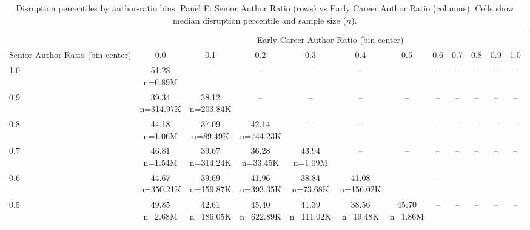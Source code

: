 \begin{table}\centering
            \caption{Disruption percentiles by author-ratio bins. Panel E: Senior Author Ratio (rows) vs Early Career Author Ratio (columns). Cells show median disruption percentile and sample size ($n$).}
            \scriptsize
            \setlength\tabcolsep{4pt}
            \renewcommand{\arraystretch}{1.1}
            \begin{tabular}{lccccccccccc}
            \toprule
            & \multicolumn{11}{c}{Early Career Author Ratio (bin center)} \\
            \cmidrule(lr){2-12}
            Senior Author Ratio (bin center) & 0.0 & 0.1 & 0.2 & 0.3 & 0.4 & 0.5 & 0.6 & 0.7 & 0.8 & 0.9 & 1.0 \\
            \midrule
            1.0 & \makecell{51.28 \\ \scriptsize n=6.89M} & -- & -- & -- & -- & -- & -- & -- & -- & -- & -- \\
0.9 & \makecell{39.34 \\ \scriptsize n=314.97K} & \makecell{38.12 \\ \scriptsize n=203.84K} & -- & -- & -- & -- & -- & -- & -- & -- & -- \\
0.8 & \makecell{44.18 \\ \scriptsize n=1.06M} & \makecell{37.09 \\ \scriptsize n=89.49K} & \makecell{42.14 \\ \scriptsize n=744.23K} & -- & -- & -- & -- & -- & -- & -- & -- \\
0.7 & \makecell{46.81 \\ \scriptsize n=1.54M} & \makecell{39.67 \\ \scriptsize n=314.24K} & \makecell{36.28 \\ \scriptsize n=33.45K} & \makecell{43.94 \\ \scriptsize n=1.09M} & -- & -- & -- & -- & -- & -- & -- \\
0.6 & \makecell{44.67 \\ \scriptsize n=350.21K} & \makecell{39.69 \\ \scriptsize n=159.87K} & \makecell{41.96 \\ \scriptsize n=393.35K} & \makecell{38.84 \\ \scriptsize n=73.68K} & \makecell{41.08 \\ \scriptsize n=156.02K} & -- & -- & -- & -- & -- & -- \\
0.5 & \makecell{49.85 \\ \scriptsize n=2.68M} & \makecell{42.61 \\ \scriptsize n=186.05K} & \makecell{45.40 \\ \scriptsize n=622.89K} & \makecell{41.39 \\ \scriptsize n=111.02K} & \makecell{38.56 \\ \scriptsize n=19.48K} & \makecell{45.70 \\ \scriptsize n=1.86M} & -- & -- & -- & -- & -- \\

\end{tabular}
\end{table}
